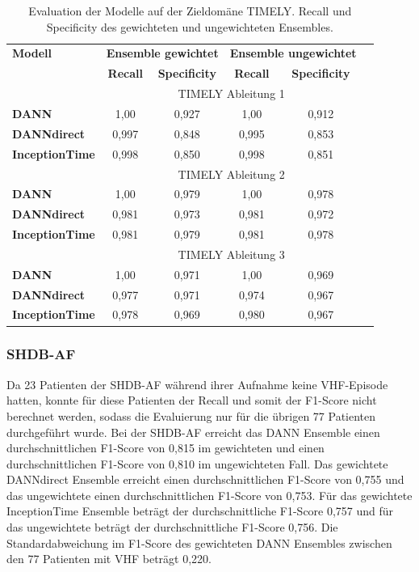 \begin{table}[h!]
\centering
\caption[Recall und Specificity TIMELY]{Evaluation der Modelle auf der Zieldomäne TIMELY. Recall und Specificity des gewichteten und ungewichteten Ensembles. }
\label{tab:sens_timely}
\begin{tabular}{lccccc}
\toprule
\textbf{Modell}     & \multicolumn{2}{c}{\textbf{Ensemble gewichtet}} & \multicolumn{2}{c}{\textbf{Ensemble ungewichtet}}\\
						& \textbf{Recall} & \textbf{Specificity}  & \textbf{Recall} & \textbf{Specificity}\\  
\midrule
					   & \multicolumn{4}{c}{{TIMELY Ableitung 1}} \\ 
\cmidrule(lr){2-5}
\textbf{DANN} 			& 1,00  & 0,927  & 1,00 & 0,912  \\
\textbf{DANNdirect}     & 0,997  & 0,848  & 0,995 & 0,853  \\
\textbf{InceptionTime}  & 0,998  & 0,850  & 0,998 & 0,851  \\
\midrule
					   & \multicolumn{4}{c}{{TIMELY Ableitung 2}} \\ 
\cmidrule(lr){2-5}
\textbf{DANN} 			& 1,00  & 0,979  & 1,00 & 0,978  \\
\textbf{DANNdirect}     & 0,981  & 0,973  & 0,981 & 0,972  \\
\textbf{InceptionTime}  & 0,981  & 0,979  & 0,981 & 0,978  \\
\midrule
					   & \multicolumn{4}{c}{{TIMELY Ableitung 3}} \\ 
\cmidrule(lr){2-5}
\textbf{DANN} 			& 1,00  & 0,971  & 1,00 & 0,969  \\
\textbf{DANNdirect}     & 0,977  & 0,971  & 0,974 & 0,967  \\
\textbf{InceptionTime}  & 0,978  & 0,969  & 0,980 & 0,967  \\

\bottomrule
\end{tabular}
\end{table}

\subsubsection*{SHDB-AF}

Da 23 Patienten der \gls{SHDB-AF} während ihrer Aufnahme keine \gls{VHF}-Episode hatten, konnte für diese Patienten der Recall und somit der F1-Score nicht berechnet werden, sodass die Evaluierung nur für die übrigen 77 Patienten durchgeführt wurde. 
Bei der \gls{SHDB-AF} erreicht das \gls{DANN} Ensemble einen durchschnittlichen F1-Score von 0,815 im gewichteten und einen durchschnittlichen F1-Score von 0,810 im ungewichteten Fall. Das gewichtete DANNdirect Ensemble erreicht einen durchschnittlichen F1-Score von 0,755 und das ungewichtete einen durchschnittlichen F1-Score von 0,753. Für das gewichtete InceptionTime Ensemble beträgt der durchschnittliche F1-Score 0,757 und für das ungewichtete beträgt der durchschnittliche F1-Score 0,756.
Die Standardabweichung im F1-Score des gewichteten \gls{DANN} Ensembles zwischen den 77 Patienten mit \gls{VHF} beträgt 0,220.



